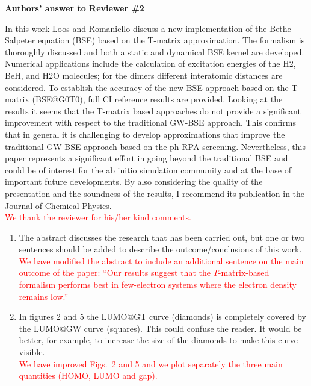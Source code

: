 \documentclass[10pt]{letter}
\newcommand{\alert}[1]{\textcolor{red}{#1}}
\begin{document}
\begin{letter}
\begin{enumerate}
\end{enumerate}

\noindent \textbf{\large Authors' answer to Reviewer \#2}

{In this work Loos and Romaniello discuss a new implementation of the Bethe-Salpeter equation (BSE) based on the T-matrix approximation. 
The formalism is thoroughly discussed and both a static and dynamical BSE kernel are developed. 
Numerical applications include the calculation of excitation energies of the H2, BeH, and H2O molecules; for the dimers different interatomic distances are considered. 
To establish the accuracy of the new BSE approach based on the T-matrix (BSE@G0T0), full CI reference results are provided. 
Looking at the results it seems that the T-matrix based approaches do not provide a significant improvement with respect to the traditional GW-BSE approach. 
This confirms that in general it is challenging to develop approximations that improve the traditional GW-BSE approach based on the ph-RPA screening. 
Nevertheless, this paper represents a significant effort in going beyond the traditional BSE and could be of interest for the ab initio simulation community and at the base of important future developments. 
By also considering the quality of the presentation and the soundness of the results, I recommend its publication in the Journal of Chemical Physics.}
\\
\alert{
We thank the reviewer for his/her kind comments.
}

\begin{enumerate}

\item 
{The abstract discusses the research that has been carried out, but one or two sentences should be added to describe the outcome/conclusions of this work.}
\\
\alert{
We have modified the abstract to include an additional sentence on the main outcome of the paper: ``Our results suggest that the $T$-matrix-based formalism performs best in few-electron systems where the electron density remains low.''
}

\item 
{In figures 2 and 5 the LUMO@GT curve (diamonds) is completely covered by the LUMO@GW curve (squares). 
This could confuse the reader. 
It would be better, for example, to increase the size of the diamonds to make this curve visible.}
\\
\alert{
We have improved Figs.~2 and 5 and we plot separately the three main quantities (HOMO, LUMO and gap).
}


\end{enumerate}
\end{letter}
\end{document}
